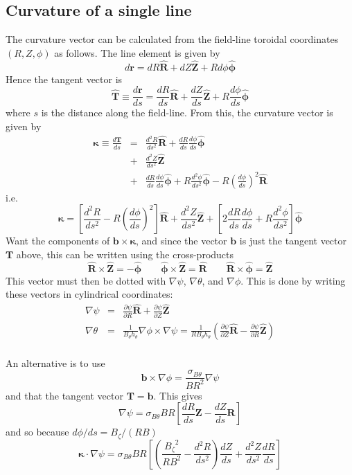 \documentclass[12pt]{article}
\newcommand{\sbt}{\ensuremath{\sigma_{B\theta}}}
\newcommand{\dd}[2]{\ensuremath{\frac{d #1}{d #2}}}
\newcommand{\ddd}[2]{\ensuremath{\frac{d^2 #1}{d #2^2}}}
\newcommand{\deriv}[2]{\ensuremath{\frac{\partial #1}{\partial #2}}}
\newcommand{\hthe}{\ensuremath{h_\theta}}
\newcommand{\Bp}{\ensuremath{B_\theta}}
\newcommand{\Bt}{\ensuremath{B_\zeta}}
\newcommand{\Vec}[1]{\ensuremath{\mathbf{#1}}}
\newcommand{\bvec}{\Vec{b}}
\newcommand{\kvec}{\Vec{\kappa}}
\newcommand{\Rvec}{\ensuremath{\hat{\Vec{R}}}}
\newcommand{\Zvec}{\ensuremath{\hat{\Vec{Z}}}}
\newcommand{\phivec}{\ensuremath{\hat{\Vec{\phi}}}}
\begin{document}
\subsection{Curvature of a single line}

The curvature vector can be calculated from the field-line toroidal
coordinates $\left(R,Z,\phi\right)$ as follows. The line element
is given by
\[
d\Vec{r} = dR\Rvec + dZ\Zvec + Rd\phi\phivec
\]
Hence the tangent vector is
\[
\hat{\Vec{T}} \equiv \dd{\Vec{r}}{s} = \dd{R}{s}\Rvec + \dd{Z}{s}\Zvec + R\dd{\phi}{s}\phivec
\]
where $s$ is the distance along the field-line. From this, the curvature vector
is given by
\begin{eqnarray*}
\kvec \equiv \dd{\Vec{T}}{s} &=& \ddd{R}{s}\Rvec + \dd{R}{s}\dd{\phi}{s}\phivec \\
&+& \ddd{Z}{s}\Zvec \\
&+& \dd{R}{s}\dd{\phi}{s}\phivec + R\ddd{\phi}{s}\phivec - R\left(\dd{\phi}{s}\right)^2 \Rvec
\end{eqnarray*}
i.e.
\begin{equation}
\kvec = \left[\ddd{R}{s} - R\left(\dd{\phi}{s}\right)^2\right]\Rvec + \ddd{Z}{s}\Zvec + \left[2\dd{R}{s}\dd{\phi}{s} + R\ddd{\phi}{s}\right]\phivec
\label{eq:kappaline}
\end{equation}
Want the components of $\Vec{b}\times\kvec$, and since the vector $\Vec{b}$
is just the tangent vector $\Vec{T}$ above, this can be written using the
cross-products
\[
\Rvec\times\Zvec = -\phivec \qquad \phivec\times\Zvec = \Rvec \qquad \Rvec\times\phivec = \Zvec
\]
This vector must then be dotted with $\nabla\psi$, $\nabla\theta$, and $\nabla\phi$. This is done by writing these vectors in cylindrical coordinates:
\begin{eqnarray*}
\nabla\psi &=& \deriv{\psi}{R}\hat{\Vec{R}} + \deriv{\psi}{Z}\hat{\Vec{Z}} \\
\nabla\theta &=& \frac{1}{\Bp\hthe}\nabla\phi\times\nabla\psi = \frac{1}{R\Bp\hthe}\left(\deriv{\psi}{Z}\hat{\Vec{R}} - \deriv{\psi}{R}\hat{\Vec{Z}}\right) \\
\end{eqnarray*}

An alternative is to use
\[
\bvec \times \nabla\phi = \frac{\sbt}{BR^2}\nabla\psi
\]
and that the tangent vector $\Vec{T} = \bvec$. This gives
\begin{equation}
\nabla\psi = \sbt BR\left[\frac{dR}{ds}\Vec{Z} - \frac{dZ}{ds}\Vec{R}\right] 
\label{eq:flinegradpsi}
\end{equation}
and so because $d\phi / ds = \Bt / \left(RB\right)$
\begin{equation}
\kvec\cdot\nabla\psi = \sbt BR\left[ \left( \frac{\Bt^2}{RB^2} - \ddd{R}{s}\right)\dd{Z}{s} + \ddd{Z}{s}\frac{dR}{ds} \right]
\label{eq:flinekappsi}
\end{equation}
\end{document}

